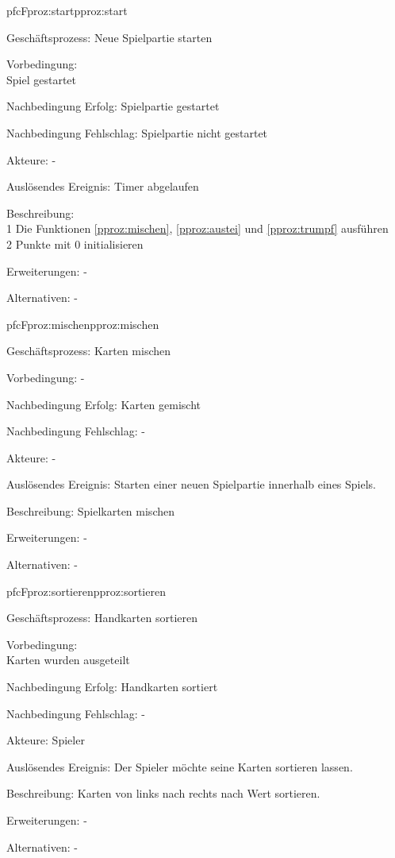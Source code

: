 \begin{description}[leftmargin=3em, style=sameline]
	\begin{php}{pfc}{F}{proz:start}{pproz:start}
		\item [Geschäftsprozess:] Neue Spielpartie starten
		\item [Vorbedingung:]\hfill\\
		Spiel gestartet 
		\item [Nachbedingung Erfolg:] Spielpartie gestartet
		\item [Nachbedingung Fehlschlag:] Spielpartie nicht gestartet
		\item [Akteure:] -
		\item [Auslösendes Ereignis:] Timer abgelaufen
		\item [Beschreibung:] \hfill\\
		1 Die Funktionen \ref{pproz:mischen}, \ref{pproz:austei} und \ref{pproz:trumpf} ausführen \\
		2 Punkte mit 0 initialisieren
		\item [Erweiterungen:] -
		\item [Alternativen:] -
	\end{php}
	
	\begin{php}{pfc}{F}{proz:mischen}{pproz:mischen}
		\item [Geschäftsprozess:] Karten mischen
		\item [Vorbedingung:] -
		\item [Nachbedingung Erfolg:] Karten gemischt
		\item [Nachbedingung Fehlschlag:] -
		\item [Akteure:] -
		\item [Auslösendes Ereignis:] Starten einer neuen Spielpartie innerhalb eines Spiels.
		\item [Beschreibung:] Spielkarten mischen
		\item [Erweiterungen:] -
		\item [Alternativen:] -
	\end{php}
	
	\begin{php}{pfc}{F}{proz:sortieren}{pproz:sortieren}
		\item [Geschäftsprozess:] Handkarten sortieren
		\item [Vorbedingung:]\hfill\\
		Karten wurden ausgeteilt
		\item [Nachbedingung Erfolg:] Handkarten sortiert
		\item [Nachbedingung Fehlschlag:] -
		\item [Akteure:] Spieler
		\item [Auslösendes Ereignis:] Der Spieler möchte seine Karten sortieren lassen.
		\item [Beschreibung:] Karten von links nach rechts nach Wert sortieren. 
		\item [Erweiterungen:] -
		\item [Alternativen:] -
	\end{php}
	

\end{description}
